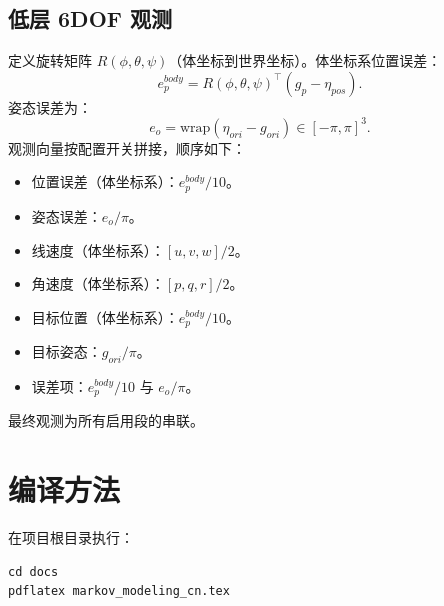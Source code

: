 \documentclass[11pt]{article}
\begin{document}
\subsection{低层 6DOF 观测}
定义旋转矩阵 $R(\phi,\theta,\psi)$（体坐标到世界坐标）。体坐标系位置误差：
\begin{equation}
 e_p^{body} = R(\phi,\theta,\psi)^\top (g_p - \eta_{pos}).
\end{equation}
姿态误差为：
\begin{equation}
 e_o = \text{wrap}(\eta_{ori} - g_{ori}) \in [-\pi,\pi]^3.
\end{equation}
观测向量按配置开关拼接，顺序如下：
\begin{itemize}
  \item 位置误差（体坐标系）：$e_p^{body}/10$。
  \item 姿态误差：$e_o/\pi$。
  \item 线速度（体坐标系）：$[u,v,w]/2$。
  \item 角速度（体坐标系）：$[p,q,r]/2$。
  \item 目标位置（体坐标系）：$e_p^{body}/10$。
  \item 目标姿态：$g_{ori}/\pi$。
  \item 误差项：$e_p^{body}/10$ 与 $e_o/\pi$。
\end{itemize}
最终观测为所有启用段的串联。

\section{编译方法}
在项目根目录执行：
\begin{verbatim}
cd docs
pdflatex markov_modeling_cn.tex
\end{verbatim}
\end{document}
